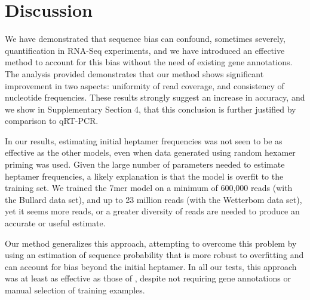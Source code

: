 \documentclass{bioinfo}
\begin{document}



\section{Discussion}

We have demonstrated that sequence bias can confound, sometimes severely,
quantification in RNA-Seq experiments, and we have introduced an effective
method to account for this bias without the need of existing gene annotations.
The analysis provided demonstrates that our method shows significant improvement
in two aspects: uniformity of read coverage, and consistency of nucleotide
frequencies. These results strongly suggest an increase in accuracy, and we show
in Supplementary Section 4, that this conclusion is further justified by
comparison to qRT-PCR.

In our results, estimating initial heptamer frequencies was not seen to be as
effective as the other models, even when data generated using random hexamer
priming was used. Given the large number of parameters needed to estimate
heptamer frequencies, a likely explanation is that the model is overfit to the
training set.  We trained the 7mer model on a minimum of 600,000 reads (with the
Bullard data set), and up to 23 million reads (with the Wetterbom data set), yet
it seems more reads, or a greater diversity of reads are needed to produce an
accurate or useful estimate.

Our method generalizes this approach, attempting to overcome this problem by
using an estimation of sequence probability that is more robust to overfitting
and can account for bias beyond the initial heptamer. In all our tests, this
approach was at least as effective as those of \citet{Li2010}, despite not
requiring gene annotations or manual selection of training examples.
\end{document}
